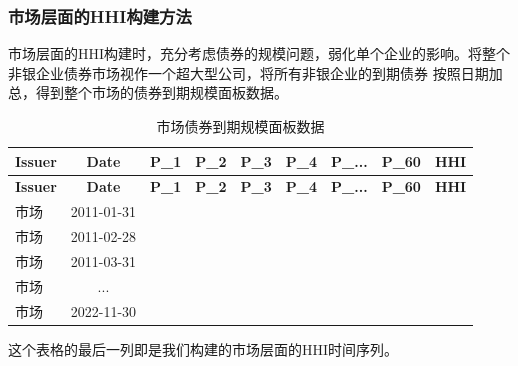 \documentclass[a4paper,12pt]{report}
\begin{document}
        \subsubsection{市场层面的HHI构建方法}
            市场层面的HHI构建时，充分考虑债券的规模问题，弱化单个企业的影响。将整个非银企业债券市场视作一个超大型公司，将所有非银企业的到期债券
            按照日期加总，得到整个市场的债券到期规模面板数据。
            \begin{longtable}{|l|c|r|r|r|r|r|r|r|}
                \caption{市场债券到期规模面板数据} \label{tab:bond-distribution} \\
                
                \hline
                \textbf{Issuer} & \textbf{Date} & \textbf{P\_1} & \textbf{P\_2} & \textbf{P\_3} & \textbf{P\_4} & \textbf{P\_...} & \textbf{P\_60} & \textbf{HHI} \\ \hline
                \endfirsthead
                
                \hline
                \textbf{Issuer} & \textbf{Date} & \textbf{P\_1} & \textbf{P\_2} & \textbf{P\_3} & \textbf{P\_4} & \textbf{P\_...} & \textbf{P\_60} & \textbf{HHI} \\ \hline
                \endhead
                
                \hline
                \endfoot
                
                市场 & 2011-01-31 &  &  &  &  &  &  &  \\ \hline
                市场 & 2011-02-28 &  &  &  &  &  &  &  \\ \hline
                市场 & 2011-03-31 &  &  &  &  &  &  &  \\ \hline
                市场 &     ...    &  &  &  &  &  &  &  \\ \hline
                市场 & 2022-11-30 &  &  &  &  &  &  &  \\ \hline
                
            \end{longtable}
            这个表格的最后一列即是我们构建的市场层面的HHI时间序列。
\end{document}
